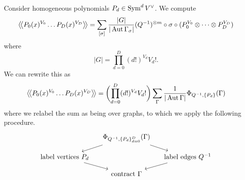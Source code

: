 \begin{example}
  Consider homogeneous polynomials $P_d \in \operatorname{Sym}^d V^\vee$. We compute
  \begin{equation*}
    \big \langle \! \big \langle {P_0(x)^{V_0} \dots P_D(x)^{V_D}} \big \rangle \! \big \rangle
    = \sum_{[\sigma]} \frac{|G|}{|\operatorname{Aut} \Gamma_\sigma|}
    (Q^{-1})^{\otimes m} \circ \sigma \circ (P_0^{V_0} \otimes \dots \otimes P_D^{V_D}) 
  \end{equation*}
  where
  \begin{equation*}
    |G| = \prod_{d = 0}^D (d!)^{V_d} V_d!.
  \end{equation*}
  We can rewrite this as
  \begin{equation*}
    \big \langle \! \big \langle {P_0(x)^{V_0} \dots P_D(x)^{V_D}} \big \rangle \! \big \rangle
    = \biggl( \prod_{d = 0}^D (d!)^{V_d} V_d! \biggr)
    \sum_{\Gamma} \frac{1}{|\operatorname{Aut} \Gamma|} \Phi_{Q^{-1}, \{P_d\}} (\Gamma)
  \end{equation*}
  where we relabel the sum as being over graphs, to which we apply the following procedure.
  \begin{equation*}
    \begin{tikzcd}[sep=small]
    & \Phi_{Q^{-1}, \{{P_d}\}_{d = 0}^D} (\Gamma) \arrow[dr] \arrow[dl] & \\
      \text{label vertices } P_d \arrow[dr] & & \text{label edges } Q^{-1} \arrow[dl] \\
    & \text{contract $\Gamma$} &
  \end{tikzcd}
  \end{equation*}
\end{example}

